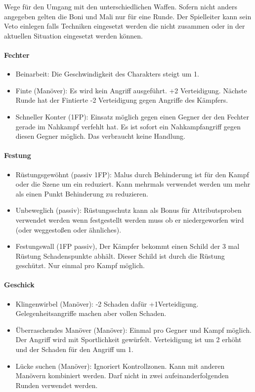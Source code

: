 \documentclass{article}
\begin{document}
Wege für den Umgang mit den unterschiedlichen Waffen. Sofern nicht anders angegeben gelten die Boni und Mali nur für
eine Runde. Der Spielleiter kann sein Veto einlegen falls Techniken eingesetzt werden die nicht zusammen oder in der
aktuellen Situation eingesetzt werden können.

\paragraph{Fechter}

\begin{itemize}
\item Beinarbeit: Die Geschwindigkeit des Charakters steigt um 1.
\item Finte (Manöver): Es wird kein Angriff ausgeführt. +2 Verteidigung. Nächste Runde hat der Fintierte -2 Verteidigung gegen Angriffe des Kämpfers.
\item Schneller Konter (1FP): Einsatz möglich gegen einen Gegner der den Fechter gerade im Nahkampf verfehlt hat. Es ist sofort ein Nahkampfangriff gegen diesen Gegner möglich. Das verbraucht keine Handlung.
\end{itemize}

\paragraph{Festung}

\begin{itemize}
\item Rüstungsgewöhnt (passiv 1FP): Malus durch Behinderung ist für den Kampf oder die Szene um ein reduziert. Kann mehrmals verwendet werden um mehr als einen Punkt Behinderung zu reduzieren.
\item Unbeweglich (passiv): Rüstungsschutz kann als Bonus für Attributsproben verwendet werden wenn festgestellt werden muss ob er niedergeworfen wird (oder weggestoßen oder ähnliches).
\item Festungswall (1FP passiv), Der Kämpfer bekommt einen Schild der 3 mal Rüstung Schadenspunkte abhält. Dieser Schild ist durch die Rüstung geschützt. Nur einmal pro Kampf möglich.
\end{itemize}

\paragraph{Geschick}

\begin{itemize}
\item Klingenwirbel (Manöver): -2 Schaden dafür +1Verteidigung. Gelegenheitsangriffe machen aber vollen Schaden.
\item Überraschendes Manöver (Manöver): Einmal pro Gegner und Kampf möglich. Der Angriff wird mit Sportlichkeit gewürfelt. Verteidigung ist um 2 erhöht und der Schaden für den Angriff um 1.
\item Lücke suchen (Manöver): Ignoriert Kontrollzonen. Kann mit anderen Manövern kombiniert werden. Darf nicht in zwei aufeinanderfolgenden Runden verwendet werden.
\end{itemize}
\end{document}
